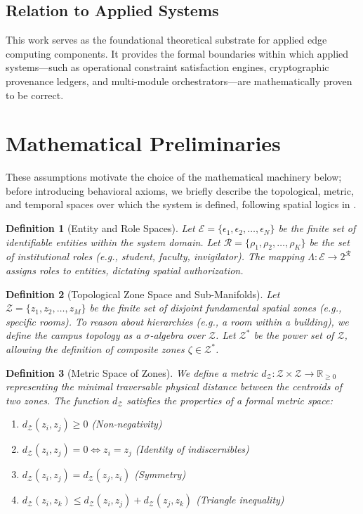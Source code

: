 \documentclass[conference]{IEEEtran}
\newtheorem{definition}{Definition}
\newcommand{\E}{\mathcal{E}} %
\newcommand{\Z}{\mathcal{Z}} %
\newcommand{\Roles}{\mathcal{R}} %
\begin{document}
\subsection{Relation to Applied Systems}
This work serves as the foundational theoretical substrate for applied edge computing components. It provides the formal boundaries within which applied systems---such as operational constraint satisfaction engines, cryptographic provenance ledgers, and multi-module orchestrators---are mathematically proven to be correct.

\section{Mathematical Preliminaries}

These assumptions motivate the choice of the mathematical machinery below; before introducing behavioral axioms, we briefly describe the topological, metric, and temporal spaces over which the system is defined, following spatial logics in \cite{b16}.

\begin{definition}[Entity and Role Spaces]
Let $\E = \{ \epsilon_1, \epsilon_2, \dots, \epsilon_N \}$ be the finite set of identifiable entities within the system domain. Let $\Roles = \{ \rho_1, \rho_2, \dots, \rho_K \}$ be the set of institutional roles (e.g., student, faculty, invigilator). The mapping $\Lambda: \E \to 2^\Roles$ assigns roles to entities, dictating spatial authorization.
\end{definition}

\begin{definition}[Topological Zone Space and Sub-Manifolds]
Let $\Z = \{ z_1, z_2, \dots, z_M \}$ be the finite set of disjoint fundamental spatial zones (e.g., specific rooms). To reason about hierarchies (e.g., a room within a building), we define the campus topology as a $\sigma$-algebra over $\Z$. Let $\Z^*$ be the power set of $\Z$, allowing the definition of composite zones $\zeta \in \Z^*$. 
\end{definition}

\begin{definition}[Metric Space of Zones]
We define a metric $d_\Z: \Z \times \Z \to \mathbb{R}_{\ge 0}$ representing the minimal traversable physical distance between the centroids of two zones. The function $d_\Z$ satisfies the properties of a formal metric space:
\begin{enumerate}
    \item $d_\Z(z_i, z_j) \ge 0$ (Non-negativity)
    \item $d_\Z(z_i, z_j) = 0 \iff z_i = z_j$ (Identity of indiscernibles)
    \item $d_\Z(z_i, z_j) = d_\Z(z_j, z_i)$ (Symmetry)
    \item $d_\Z(z_i, z_k) \le d_\Z(z_i, z_j) + d_\Z(z_j, z_k)$ (Triangle inequality)
\end{enumerate}
\end{definition}
\end{document}
